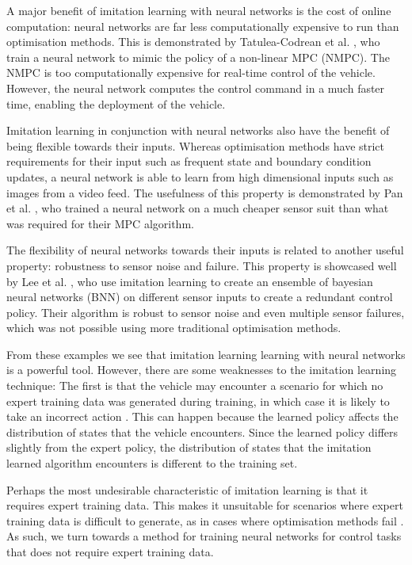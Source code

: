 A major benefit of imitation learning with neural networks is the cost of online computation: neural networks are far less computationally expensive to run than optimisation methods. This is demonstrated by Tatulea-Codrean et al. \cite{Tatulea-Codrean2020}, who train a neural network to mimic the policy of a non-linear MPC (NMPC). The NMPC is too computationally expensive for real-time control of the vehicle. 
However, the neural network computes the control command in a much faster time, enabling the deployment of the vehicle.

Imitation learning in conjunction with neural networks also have the benefit of being flexible towards their inputs. 
Whereas optimisation methods have strict requirements for their input such as frequent state and boundary condition updates, a neural network is able to learn from high dimensional inputs such as images from a video feed. 
The usefulness of this property is demonstrated by Pan et al. \cite{Pan2017a}, who trained a neural network on a much cheaper sensor suit than what was required for their MPC algorithm.

The flexibility of neural networks towards their inputs is related to another useful property: robustness to sensor noise and failure. 
This property is showcased well by Lee et al. \cite{lee2019}, who use imitation learning to create an ensemble of bayesian neural networks (BNN) on different sensor inputs to create a redundant control policy. 
Their algorithm is robust to sensor noise and even multiple sensor failures, which was not possible using more traditional optimisation methods.

From these examples we see that imitation learning learning with neural networks is a powerful tool.
However, there are some weaknesses to the imitation learning technique:
The first is that the vehicle may encounter a scenario for which no expert training data was generated during training, in which case it is likely to take an incorrect action \cite{Osa_2018}.
This can happen because the learned policy affects the distribution of states that the vehicle encounters.
Since the learned policy differs slightly from the expert policy, the distribution of states that the imitation learned algorithm encounters is different to the training set.


Perhaps the most undesirable characteristic of imitation learning is that it requires expert training data.
This makes it unsuitable for scenarios where expert training data is difficult to generate, as in cases where optimisation methods fail \cite{Fuchs2021a}.
As such, we turn towards a method for training neural networks for control tasks that does not require expert training data.

